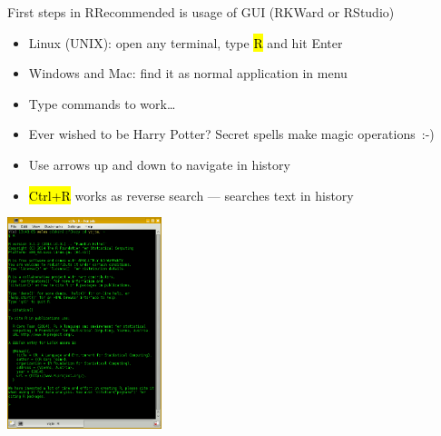 \documentclass[compress, ucs, xelatex, 11pt, xcolor=svgnames,
	hyperref={
		bookmarks=true,
		unicode=true,
		colorlinks=true,
		pdftitle={Molecular data in R},
		plainpages=false,
		pdfauthor={Vojtech Zeisek},
		pdfsubject={Course about phylogeny and evolution in R},
		pdfcreator={XeLaTeX},
		pdfkeywords={R, evolution, phylogeny, molecular data},
		linkcolor=Tomato,
		anchorcolor=SaddleBrown,
		citecolor=Goldenrod,
		filecolor=DarkMagenta,
		menucolor=Sienna,
		urlcolor=DarkTurquoise,
		pdftex},
	url={hyphens, lowtilde} %
	]{beamer}
\renewcommand{\texttt}[1]{\hl{\ttfamily #1}}
\begin{document}
\begin{frame}{First steps in R}{Recommended is usage of GUI (RKWard or RStudio)}
	\begin{multicols}{2}
		\begin{itemize}
			\item Linux (UNIX): open any terminal, type \texttt{R} and hit Enter
			\item Windows and Mac: find it as normal application in menu
			\item Type commands to work\ldots
			\item \alert{Ever wished to be Harry Potter? Secret spells make magic operations~:-)}
			\item Use arrows up and down to navigate in history
			\item \texttt{Ctrl+R} works as reverse search --- searches text in history
		\end{itemize}
		\columnbreak
		\begin{center}
			\includegraphics[width=4.5cm]{rkonsole.png}
		\end{center}
	\end{multicols}
\end{frame}
\end{document}
